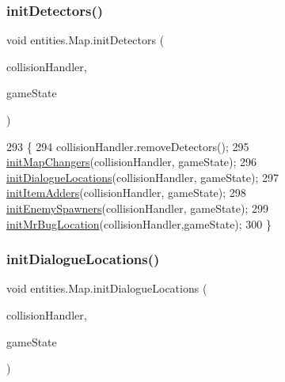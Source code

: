\mbox{\label{classentities_1_1_map_a501c11a9a6f076a7a2e8c8880eeceae6}} 
\subsubsection{\texorpdfstring{init\+Detectors()}{initDetectors()}}
{\footnotesize\ttfamily void entities.\+Map.\+init\+Detectors (\begin{DoxyParamCaption}\item[{\mbox{\hyperlink{classentities_1_1_collision_handler}{Collision\+Handler}}}]{collision\+Handler,  }\item[{\mbox{\hyperlink{classstates_1_1_game_state}{Game\+State}}}]{game\+State }\end{DoxyParamCaption})\hspace{0.3cm}{\ttfamily [inline]}}


\begin{DoxyCode}
293                                                                                       \{
294         collisionHandler.removeDetectors();
295         \mbox{\hyperlink{classentities_1_1_map_a7ac25d4d491cdb9d26421146fc622978}{initMapChangers}}(collisionHandler, gameState);
296         \mbox{\hyperlink{classentities_1_1_map_ae795d01c06b1f04f16065702fa5e2801}{initDialogueLocations}}(collisionHandler, gameState);
297         \mbox{\hyperlink{classentities_1_1_map_aab876045f8037049288a1683cb0c250b}{initItemAdders}}(collisionHandler, gameState);
298         \mbox{\hyperlink{classentities_1_1_map_a475dade0cc451ced58633690801baec5}{initEnemySpawners}}(collisionHandler, gameState);
299         \mbox{\hyperlink{classentities_1_1_map_a8678aecbe6308ad69b2596d3452974cf}{initMrBugLocation}}(collisionHandler,gameState);
300     \}
\end{DoxyCode}
\mbox{\label{classentities_1_1_map_ae795d01c06b1f04f16065702fa5e2801}} 
\subsubsection{\texorpdfstring{init\+Dialogue\+Locations()}{initDialogueLocations()}}
{\footnotesize\ttfamily void entities.\+Map.\+init\+Dialogue\+Locations (\begin{DoxyParamCaption}\item[{final \mbox{\hyperlink{classentities_1_1_collision_handler}{Collision\+Handler}}}]{collision\+Handler,  }\item[{\mbox{\hyperlink{classstates_1_1_game_state}{Game\+State}}}]{game\+State }\end{DoxyParamCaption})\hspace{0.3cm}{\ttfamily [inline]}}

